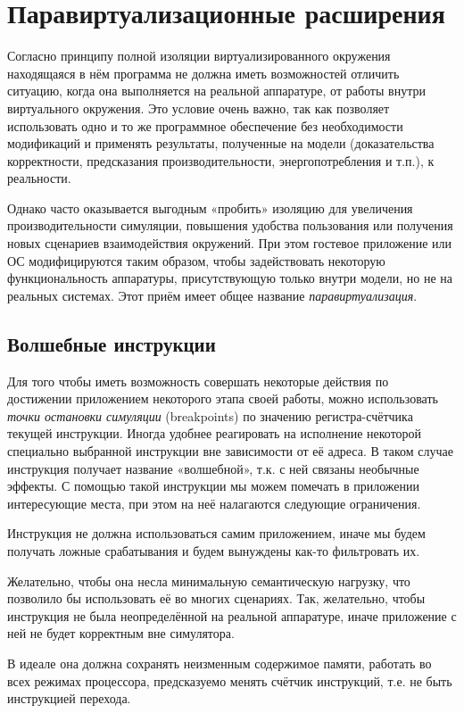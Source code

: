 \section{Паравиртуализационные расширения}

Согласно принципу полной изоляции виртуализированного окружения находящаяся в нём программа не должна иметь возможностей отличить ситуацию, когда она выполняется на реальной аппаратуре, от работы внутри виртуального окружения. Это условие очень важно, так как позволяет использовать одно и то же программное обеспечение без необходимости модификаций и применять результаты, полученные на модели (доказательства корректности, предсказания производительности, энергопотребления и т.п.), к реальности.

Однако часто оказывается выгодным «пробить» изоляцию для увеличения производительности симуляции, повышения удобства пользования или получения новых сценариев взаимодействия окружений. При этом гостевое приложение или ОС модифицируются таким образом, чтобы задействовать некоторую функциональность аппаратуры, присутствующую только внутри модели, но не на реальных системах. Этот приём имеет общее название \textit{паравиртуализация}.

\subsection{Волшебные инструкции}

Для того чтобы иметь возможность совершать некоторые действия по достижении приложением некоторого этапа своей работы, можно использовать \textit{точки остановки симуляции} (\abbr breakpoints) по значению регистра-счётчика текущей инструкции. Иногда удобнее реагировать на исполнение некоторой специально выбранной инструкции вне зависимости от её адреса. В таком случае инструкция получает название «волшебной», т.к. с ней связаны необычные эффекты. С помощью такой инструкции мы можем помечать в приложении интересующие места, при этом на неё налагаются следующие ограничения.

\begin{itemize*}
\item    Инструкция не должна использоваться самим приложением, иначе мы будем получать ложные срабатывания и будем вынуждены как-то фильтровать их.
\item    Желательно, чтобы она несла минимальную семантическую нагрузку, что позволило бы использовать её во многих сценариях. Так, желательно, чтобы инструкция не была неопределённой на реальной аппаратуре, иначе приложение с ней не будет корректным вне симулятора. 
\item В идеале она должна сохранять неизменным содержимое памяти, работать во всех режимах процессора, предсказуемо менять счётчик инструкций, т.е. не быть инструкцией перехода. 
\end{itemize*}

